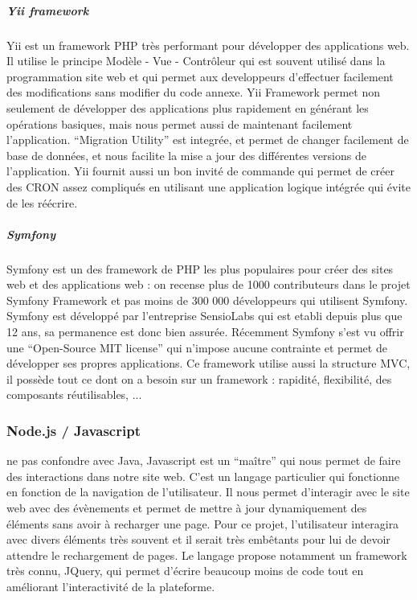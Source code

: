             \subparagraph{Yii framework}
            \label{subpar:yii}
            Yii est un framework PHP très performant pour développer des applications web. Il utilise le principe
            Modèle - Vue - Contrôleur qui est souvent utilisé dans la programmation site web et qui permet aux developpeurs
            d’effectuer facilement des modifications sans modifier du code annexe. Yii Framework permet non seulement
            de développer des applications plus rapidement en générant les opérations basiques, mais nous permet aussi
            de maintenant facilement l’application. “Migration Utility” est integrée, et permet de changer facilement
            de base de données, et nous facilite la mise a jour des différentes versions de l’application. Yii fournit
            aussi un bon invité de commande qui permet de créer des CRON assez compliqués en utilisant une application
            logique intégrée qui évite de les réécrire.

            \subparagraph{Symfony}
            \label{subpar:symfony}
            Symfony est un des framework de PHP les plus populaires pour créer des sites web et des applications web :
            on recense plus de 1000 contributeurs dans le projet Symfony Framework et pas moins de 300 000 développeurs
            qui utilisent Symfony. Symfony est développé par l'entreprise SensioLabs qui est etabli depuis plus que 12 ans,
            sa permanence est donc bien assurée. Récemment Symfony s’est vu offrir une “Open-Source MIT license”
            qui n'impose aucune contrainte et permet de développer ses propres applications. Ce framework utilise aussi
            la structure MVC, il possède tout ce dont on a besoin sur un framework : rapidité, flexibilité, des composants réutilisables, ...

        \subsubsection{Node.js / Javascript}
        \label{subsubsec:node}
         ne pas confondre avec Java, Javascript est un “maître” qui nous permet de faire des interactions dans notre site web.
         C’est un langage particulier qui fonctionne en fonction de la navigation de l’utilisateur. Il nous permet d’interagir
         avec le site web avec des évènements et permet de mettre à jour dynamiquement des éléments sans avoir à recharger une page.
         Pour ce projet, l’utilisateur interagira avec divers éléments très souvent et il serait très embêtants pour lui
         de devoir attendre le rechargement de pages. Le langage propose notamment un framework très connu, JQuery,
         qui permet d’écrire beaucoup moins de code tout en améliorant l’interactivité de la plateforme.

